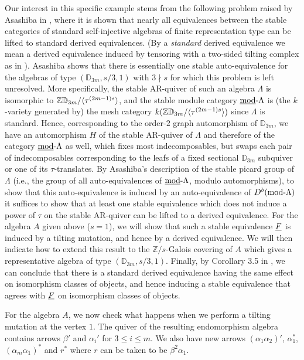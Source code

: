 \documentclass{amsart}
\begin{document}
Our interest in this specific example stems from the following problem raised by Asashiba in \cite{Asa2}, where it is shown that nearly all equivalences between the stable categories of standard self-injective algebras of finite representation type can be lifted to standard derived equivalences.  (By a {\it standard} derived equivalence we mean a derived equivalence induced by tensoring with a two-sided tilting complex as in \cite{DEDF}).  Asashiba shows that there is essentially one stable auto-equivalence for the algebras of type $(\mathbb{D}_{3m},s/3,1)$ with $3\nmid s$ for which this problem is left unresolved.  More specifically, the stable AR-quiver of such an algebra $\Lambda$ is isomorphic to $\mathbb{ZD}_{3m}/\langle \tau^{(2m-1)s} \rangle$, and the stable module category $\mbox{\underline{mod}-} \Lambda$ is (the $k$-variety generated by) the mesh category $k(\mathbb{ZD}_{3m}/\langle \tau^{(2m-1)s} \rangle)$ since $\Lambda$ is standard.  Hence, corresponding to the order-$2$ graph automorphism of $\mathbb{D}_{3m}$, we have an automorphism $H$ of the stable AR-quiver of $\Lambda$ and therefore of the category $\mbox{\underline{mod}-} \Lambda$ as well, which fixes most indecomposables, but swaps each pair of indecomposables corresponding to the leafs of a fixed sectional $\mathbb{D}_{3m}$ subquiver or one of its $\tau$-translates.  By Asashiba's description of the stable picard group of $\Lambda$ (i.e., the group of all auto-equivalences of $\mbox{\underline{mod}-} \Lambda$, modulo automorphisms), to show that this auto-equivalence is induced by an auto-equivalence of $D^b(\mbox{mod-} \Lambda)$ it suffices to show that at least one stable equivalence which does not induce a power of $\tau$ on the stable AR-quiver can be lifted to a derived equivalence.  For the algebra $A$ given above ($s=1$), we will show that such a stable equivalence $\underline{F}$ is induced by a tilting mutation, and hence by a derived equivalence.  We will then indicate how to extend this result to the $\mathbb{Z}/s$-Galois covering of $A$ which gives a representative algebra of type $(\mathbb{D}_{3m},s/3,1)$.  Finally, by Corollary 3.5 in \cite{DEDF}, we can conclude that there is a standard derived equivalence having the same effect on isomorphism classes of objects, and hence inducing a stable equivalence that agrees with $\underline{F}$ on isomorphism classes of objects.

For the algebra $A$, we now check what happens when we perform a tilting mutation at the vertex $1$.  The quiver of the resulting endomorphism algebra contains arrows $\beta'$ and $\alpha_i'$ for $3 \leq i \leq m$.  We also have new arrows $(\alpha_1 \alpha_2)'$, $\alpha_1^*$, $(\alpha_m \alpha_1)^*$ and $r^*$ where $r$ can be taken to be %
$\beta^2\alpha_1$.
\end{document}
